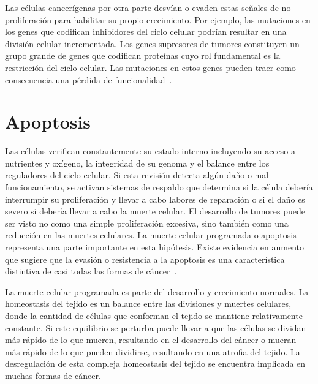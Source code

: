 Las c\'elulas cancer\'igenas por otra parte desv\'ian o evaden estas se\~nales de no proliferaci\'on para habilitar su propio crecimiento. Por ejemplo, las mutaciones en los genes que codifican inhibidores del ciclo celular podr\'ian resultar en una divisi\'on celular incrementada. Los genes supresores de tumores constituyen un grupo grande de genes que codifican prote\'inas cuyo rol fundamental es la restricci\'on del ciclo celular. Las mutaciones en estos genes pueden traer como consecuencia una p\'erdida de funcionalidad~\cite{robins,hanahan,cancerbook}.

\section{Apoptosis}
\label{subsec-apopt}
Las c\'elulas verifican constantemente su estado interno incluyendo su acceso a nutrientes y ox\'igeno, la integridad de su genoma y el balance entre los reguladores del ciclo celular. Si esta revisi\'on detecta alg\'un da\~no o mal funcionamiento, se activan sistemas de respaldo que determina si la c\'elula deber\'ia interrumpir su proliferaci\'on y llevar a cabo labores de reparaci\'on o si el da\~no es severo si deber\'ia llevar a cabo la muerte celular. El desarrollo de tumores puede ser visto no como una simple proliferaci\'on excesiva, sino tambi\'en como una reducci\'on en las muertes celulares. La muerte celular programada o apoptosis representa una parte importante en esta hip\'otesis. Existe evidencia en aumento que sugiere que la evasi\'on o resistencia a la apoptosis es una caracter\'istica distintiva de casi todas las formas de c\'ancer~\cite{robins,hanahan,cancerbook}.

La muerte celular programada es parte del desarrollo y crecimiento normales. La homeostasis del tejido es un balance entre las divisiones y muertes celulares, donde la cantidad de c\'elulas que conforman el tejido se mantiene relativamente constante. Si este equilibrio se perturba puede llevar a que las c\'elulas se dividan m\'as r\'apido de lo que mueren, resultando en el desarrollo del c\'ancer o mueran m\'as r\'apido de lo que pueden dividirse, resultando en una atrofia del tejido. La desregulaci\'on de esta compleja homeostasis del tejido se encuentra implicada en muchas formas de c\'ancer.

